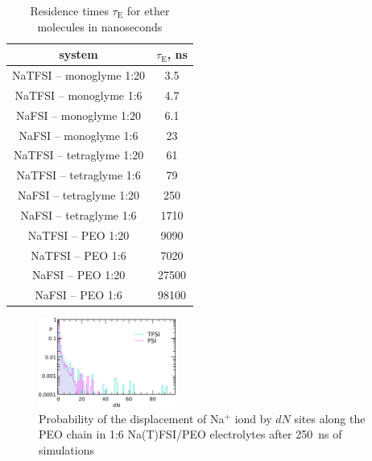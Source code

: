 \begin{table}[ht]
  \centering
  \caption{Residence times $\tau_{\text{E}}$ for ether molecules in nanoseconds}
  \label{tab:peo-na-residence}
\begin{tabular}{cc}
\toprule
system                              & $\tau_{\text{E}}$, ns                    \\
\midrule
NaTFSI – monoglyme 1:20             & 3.5                       \\
NaTFSI – monoglyme 1:6              & 4.7                       \\
NaFSI – monoglyme 1:20              & 6.1                       \\
NaFSI – monoglyme 1:6               & 23                        \\
NaTFSI – tetraglyme 1:20            & 61                        \\
NaTFSI – tetraglyme 1:6             & 79                        \\
NaFSI – tetraglyme 1:20             & 250                       \\
NaFSI – tetraglyme 1:6              & 1710                      \\
NaTFSI – PEO 1:20                   & 9090                      \\
NaTFSI – PEO 1:6                    & 7020                      \\
NaFSI – PEO 1:20                    & 27500                     \\
NaFSI – PEO 1:6 & 98100 \\
\bottomrule
\end{tabular}
\end{table}

\begin{figure}[ht]
    \centering
    \includegraphics[width=0.4\textwidth]{img/3-structural-data-from-md-simulations/5-peo-na/peo-dn-2.png}
    \caption{Probability of the displacement of Na$^{+}$ iond by $dN$ sites along the PEO chain in 1:6 Na(T)FSI/PEO electrolytes after 250~ns of simulations}
    \label{fig:peo-na-peo-dn-2}
\end{figure}


